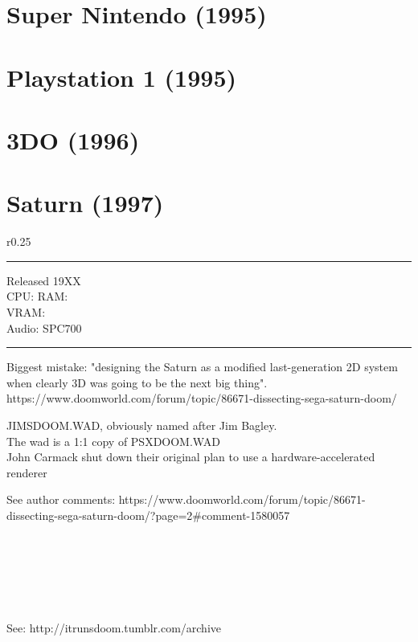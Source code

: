 \section{Super Nintendo (1995)}









\section{Playstation 1 (1995)}











\section{3DO (1996)}





\section{Saturn (1997)}
\begin{wrapfigure}[12]{r}{0.25\textwidth}{\centering {}}
\hrule 
\bigskip
   Released 19XX\\
   CPU: 
   RAM:\\
   VRAM:\\
   Audio: SPC700\\
\hrule 
\end{wrapfigure}
Biggest mistake: "designing the Saturn as a modified last-generation 2D system when clearly 3D was going to be the next big thing".\\
https://www.doomworld.com/forum/topic/86671-dissecting-sega-saturn-doom/\\
\par
JIMSDOOM.WAD, obviously named after Jim Bagley.\\
The wad is a 1:1 copy of PSXDOOM.WAD\\
John Carmack shut down their original plan to use a hardware-accelerated renderer\\
\par
See author comments: https://www.doomworld.com/forum/topic/86671-dissecting-sega-saturn-doom/?page=2\#comment-1580057\\
\par
{}
\\
\\
\\
\par
{}\\




\par 
{}
\par
See: http://itrunsdoom.tumblr.com/archive\\
\par




